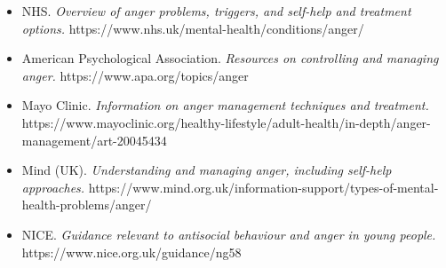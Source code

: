 \begin{itemize}
    \item NHS. \textit{Overview of anger problems, triggers, and self-help and treatment options.} https://www.nhs.uk/mental-health/conditions/anger/
    \item American Psychological Association. \textit{Resources on controlling and managing anger.} https://www.apa.org/topics/anger
    \item Mayo Clinic. \textit{Information on anger management techniques and treatment.} https://www.mayoclinic.org/healthy-lifestyle/adult-health/in-depth/anger-management/art-20045434
    \item Mind (UK). \textit{Understanding and managing anger, including self-help approaches.} https://www.mind.org.uk/information-support/types-of-mental-health-problems/anger/
    \item NICE. \textit{Guidance relevant to antisocial behaviour and anger in young people.} https://www.nice.org.uk/guidance/ng58
\end{itemize}

